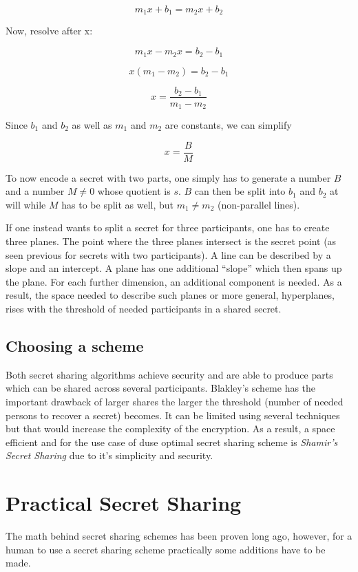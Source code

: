 $$m_1x + b_1 = m_2x + b_2$$

Now, resolve after x:

$$m_1x - m_2x = b_2 - b_1 $$

$$x (m_1 - m_2) = b_2 - b_1$$

$$x = \frac{b_2 - b_1}{m_1 - m_2}$$

Since $b_1$ and $b_2$ as well as $m_1$ and $m_2$ are constants, we can simplify

$$x = \frac{B}{M}$$

To now encode a secret with two parts, one simply has to generate a number $B$
and a number $M \neq 0$ whose quotient is $s$.
$B$ can then be split into $b_1$ and $b_2$ at will
while $M$ has to be split as well, but $m_1 \neq m_2$ (non-parallel lines).

If one instead wants to split a secret for three participants, one has to
create three planes. The point where the three planes intersect
is the secret point (as seen previous for secrets with two participants).
A line can be described by a slope and an intercept. A plane has one
additional ``slope'' which then spans up the plane. For each further
dimension, an additional component is needed. As a result, the space needed
to describe such planes or more general, hyperplanes, rises with the
threshold of needed participants in a shared secret.

\cite{blakley1994linear}

\subsection{Choosing a scheme}

Both secret sharing algorithms achieve security and are able to produce
parts which can be shared across several participants. Blakley's scheme
has the important drawback of larger shares the larger the threshold (number
of needed persons to recover a secret) becomes. It can be limited using
several techniques but that would increase the complexity of the encryption.
As a result, a space efficient and for the use case of duse optimal secret sharing
scheme is \textit{Shamir's Secret Sharing} due to it's simplicity and
security.

\section{Practical Secret Sharing}

The math behind secret sharing schemes has been proven long ago, however, for a
human to use a secret sharing scheme practically some additions have to be
made.

